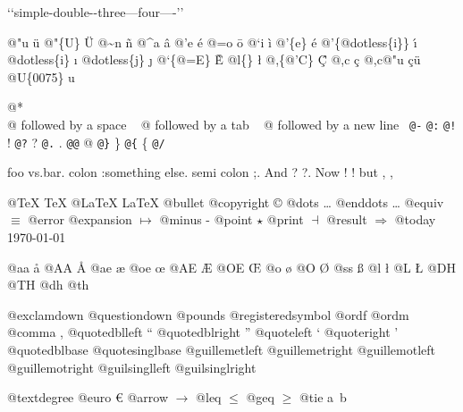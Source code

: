 \documentclass{book}
\begin{document}
`\hbox{}`simple-double-\hbox{}-three---four----'\hbox{}'\leavevmode{}\\

%
%
%
%

@"u \"{u} 
@"\{U\} \"{U} 
@\~{}n \~{n}
@\^{}a \^{a}
@'e \'{e}
@=o \={o}
@`i \`{i}
@'\{e\} \'{e}
@'\{@dotless\{i\}\} \'{\i{}} 
@dotless\{i\} \i{}
@dotless\{j\} \j{}
@`\{@=E\} \`{\={E}} 
@l\{\} \l{}
@,\{@'C\} \c{\'{C}}
@,c \c{c}
@,c@"u \c{c}\"{u} \leavevmode{}\\

@U\{0075\} u

@* \leavevmode{}\\
@ followed by a space
\ {}
@ followed by a tab
\ {}
@ followed by a new line
\ {}\texttt{@-} \-{}
\texttt{@:} \@
\texttt{@!} \@!
\texttt{@?} \@?
\texttt{@.} \@.
\texttt{@@} @
\texttt{@\}} \}
\texttt{@\{} \{
\texttt{@/} 

foo vs.\@ bar. 
colon :\@And something else.
semi colon ;\@.
And ? ?\@.
Now ! !\@@
but , ,\@

@TeX \TeX{}
@LaTeX \LaTeX{}
@bullet \textbullet{}
@copyright \copyright{}
@dots \dots{}\@
@enddots \dots{}
@equiv $\equiv{}$
@error 
@expansion $\mapsto{}$
@minus -
@point $\star{}$
@print $\dashv{}$
@result $\Rightarrow{}$
@today \today{}

@aa \aa{}
@AA \AA{}
@ae \ae{}
@oe \oe{}
@AE \AE{}
@OE \OE{}
@o \o{}
@O \O{}
@ss \ss{}
@l \l{}
@L \L{}
@DH \DH{}
@TH \TH{}
@dh \dh{}
@th \th{}

@exclamdown \textexclamdown{}
@questiondown \textquestiondown{}
@pounds \textsterling{}
@registeredsymbol \circledR{}
@ordf \textordfeminine{}
@ordm \textordmasculine{}
@comma ,
@quotedblleft \textquotedblleft{}
@quotedblright \textquotedblright{}
@quoteleft \textquoteleft{}
@quoteright \textquoteright{}
@quotedblbase \quotedblbase{}
@quotesinglbase \quotesinglbase{}
@guillemetleft \guillemotleft{}
@guillemetright \guillemotright{}
@guillemotleft \guillemotleft{}
@guillemotright \guillemotright{}
@guilsinglleft \guilsinglleft{}
@guilsinglright \guilsinglright{}

@textdegree \textdegree{}
@euro \euro{}
@arrow $\rightarrow{}$
@leq $\leq{}$
@geq $\geq{}$
@tie a~b
\end{document}
